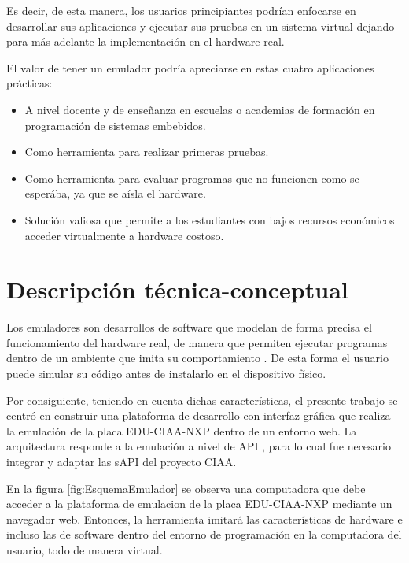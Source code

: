 Es decir, de esta manera, los usuarios principiantes podrían enfocarse en desarrollar sus aplicaciones y ejecutar sus pruebas en un sistema virtual dejando para más adelante la implementación en el hardware real.

El valor de tener un emulador podría apreciarse en estas cuatro aplicaciones prácticas:
\begin{itemize}
	\item A nivel docente y de enseñanza en escuelas o academias de formación en programación de sistemas embebidos.
	\item Como herramienta para realizar primeras pruebas.
	\item Como herramienta para evaluar programas que no funcionen como se esperába, ya que se aísla el hardware.
	\item Solución valiosa que permite a los estudiantes con bajos recursos económicos acceder virtualmente a hardware costoso.
\end{itemize}



\section{Descripción técnica-conceptual}

Los emuladores son desarrollos de software que modelan de forma precisa el funcionamiento del hardware real, de manera que permiten ejecutar programas dentro de un ambiente que imita su comportamiento \citep{sanchezqemu}. De esta forma el usuario puede simular su código antes de instalarlo en el dispositivo físico.

Por consiguiente, teniendo en cuenta dichas características, el presente trabajo se centró en construir una plataforma de desarrollo con interfaz gráfica que realiza la emulación de la placa EDU-CIAA-NXP dentro de un entorno web. La arquitectura responde a la emulación a nivel de API \citep{API}, para lo cual fue necesario integrar y adaptar las sAPI del proyecto CIAA.

En la figura \ref{fig:EsquemaEmulador} se observa una computadora que debe acceder a la plataforma de emulacion de la placa EDU-CIAA-NXP mediante un navegador web. Entonces, la herramienta imitará las características de hardware e incluso las de software dentro del entorno de programación en la computadora del usuario, todo de manera virtual.

